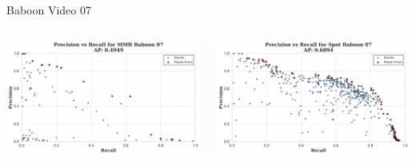\begin{frame}{Baboon Video 07}
    \begin{columns}
        \begin{column}{0.48\textwidth}
            \centering
            \includegraphics[width=\textwidth,height=0.7\textheight,keepaspectratio]{images/bom/precision_recall_MMB_Baboon_07.png}
        \end{column}
        \begin{column}{0.48\textwidth}
            \centering
            \includegraphics[width=\textwidth,height=0.7\textheight,keepaspectratio]{images/bom/precision_recall_Spot_Baboon_07.png}
        \end{column}
    \end{columns}
\end{frame}

